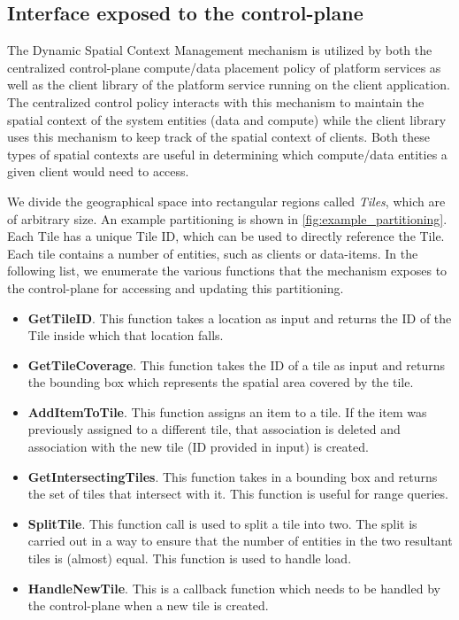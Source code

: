 \subsection{Interface exposed to the control-plane}
The Dynamic Spatial Context Management mechanism is utilized by both the centralized control-plane compute/data placement policy of platform services as well as the client library of the platform service running on the client application. The centralized control policy interacts with this mechanism to maintain the spatial context of the system entities (data and compute) while the client library uses this mechanism to keep track of the spatial context of clients. Both these types of spatial contexts are useful in determining which compute/data entities a given client would need to access. 
\par We divide the geographical space into rectangular regions called \textit{Tiles}, which are of arbitrary size. An example partitioning is shown in \cref{fig:example_partitioning}. Each Tile has a unique Tile ID, which can be used to directly reference the Tile. Each tile contains a number of entities, such as clients or data-items. In the following list, we enumerate the various functions that the mechanism exposes to the control-plane for accessing and updating this partitioning.
\begin{itemize}
\item \textbf{GetTileID}. This function takes a location as input and returns the ID of the Tile inside which that location falls.
\item \textbf{GetTileCoverage}. This function takes the ID of a tile as input and returns the bounding box which represents the spatial area covered by the tile.
\item \textbf{AddItemToTile}. This function assigns an item to a tile. If the item was previously assigned to a different tile, that association is deleted and association with the new tile (ID provided in input) is created.
\item \textbf{GetIntersectingTiles}. This function takes in a bounding box and returns the set of tiles that intersect with it. This function is useful for range queries.
\item \textbf{SplitTile}. This function call is used to split a tile into two. The split is carried out in a way to ensure that the number of entities in the two resultant tiles is (almost) equal. This function is used to handle load.
\item \textbf{HandleNewTile}. This is a callback function which needs to be handled by the control-plane when a new tile is created. 
\end{itemize}

